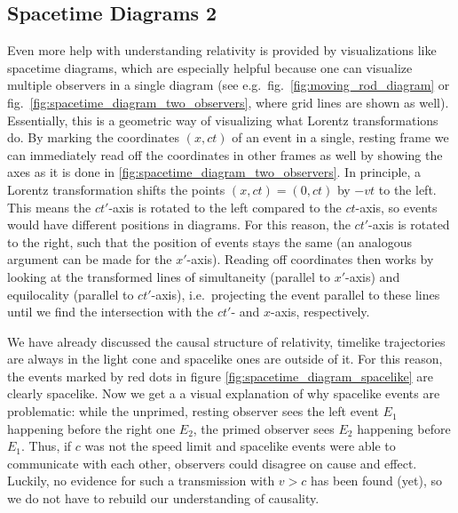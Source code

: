 		\subsection{Spacetime Diagrams 2}
Even more help with understanding relativity is provided by visualizations like spacetime diagrams, which are especially helpful because one can visualize multiple observers in a single diagram (see e.g.~fig.~\ref{fig:moving_rod_diagram} or fig.~\ref{fig:spacetime_diagram_two_observers}, where grid lines are shown as well). Essentially, this is a geometric way of visualizing what Lorentz transformations do. By marking the coordinates $(x, ct)$ of an event in a single, resting frame we can immediately read off the coordinates in other frames as well by showing the axes as it is done in \ref{fig:spacetime_diagram_two_observers}. In principle, a Lorentz transformation shifts the points $(x, ct) = (0, ct)$ by $-vt$ to the left. This means the $ct'$-axis is rotated to the left compared to the $ct$-axis, so events would have different positions in diagrams. For this reason, the $ct'$-axis is rotated to the right, such that the position of events stays the same (an analogous argument can be made for the $x'$-axis). Reading off coordinates then works by looking at the transformed lines of simultaneity (parallel to $x'$-axis) and equilocality (parallel to $ct'$-axis), i.e.~projecting the event parallel to these lines until we find the intersection with the $ct'$- and $x$-axis, respectively.




We have already discussed the causal structure of relativity, timelike trajectories are always in the light cone and spacelike ones are outside of it. For this reason, the events marked by red dots in figure \ref{fig:spacetime_diagram_spacelike} are clearly spacelike. Now we get a a visual explanation of why spacelike events are problematic: while the unprimed, resting observer sees the left event $E_1$ happening before the right one $E_2$, the primed observer sees $E_2$ happening before $E_1$. Thus, if $c$ was not the speed limit and spacelike events were able to communicate with each other, observers could disagree on cause and effect. Luckily, no evidence for such a transmission with $v > c$ has been found (yet), so we do not have to rebuild our understanding of causality.\\



